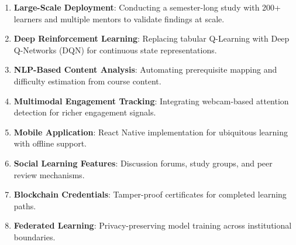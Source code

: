 \documentclass[conference]{IEEEtran}
\begin{document}
\begin{enumerate}
    \item \textbf{Large-Scale Deployment}: Conducting a semester-long study with 200+ learners and multiple mentors to validate findings at scale.
    \item \textbf{Deep Reinforcement Learning}: Replacing tabular Q-Learning with Deep Q-Networks (DQN) for continuous state representations.
    \item \textbf{NLP-Based Content Analysis}: Automating prerequisite mapping and difficulty estimation from course content.
    \item \textbf{Multimodal Engagement Tracking}: Integrating webcam-based attention detection for richer engagement signals.
    \item \textbf{Mobile Application}: React Native implementation for ubiquitous learning with offline support.
    \item \textbf{Social Learning Features}: Discussion forums, study groups, and peer review mechanisms.
    \item \textbf{Blockchain Credentials}: Tamper-proof certificates for completed learning paths.
    \item \textbf{Federated Learning}: Privacy-preserving model training across institutional boundaries.
\end{enumerate}
\end{document}
